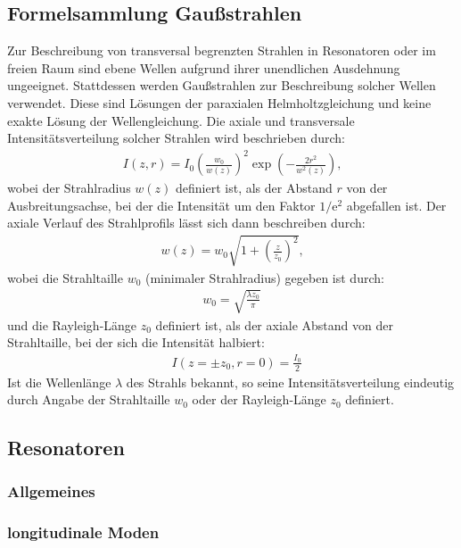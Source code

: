 \documentclass[11pt, a4paper]{article}
\numberwithin{equation}{section}
\begin{document}
\subsection{Formelsammlung Gaußstrahlen \cite{linden}}
\label{gaussstrahlen}
Zur Beschreibung von transversal begrenzten Strahlen in Resonatoren oder im freien Raum sind ebene Wellen aufgrund ihrer unendlichen Ausdehnung ungeeignet.
Stattdessen werden Gaußstrahlen zur Beschreibung solcher Wellen verwendet.
Diese sind Lösungen der paraxialen Helmholtzgleichung und keine exakte Lösung der Wellengleichung.
Die axiale und transversale Intensitätsverteilung solcher Strahlen wird beschrieben durch:
\begin{align}
	I(z,r) = I_0 \left( \frac{w_0}{w(z)} \right)^2 \exp\left(- \frac{2 r^2}{w^2(z)} \right) \text{,}
\end{align}
wobei der Strahlradius $w(z)$ definiert ist, als der Abstand $r$ von der Ausbreitungsachse, bei der die Intensität um den Faktor $1/ \mathrm{e}^2$ abgefallen ist.
Der axiale Verlauf des Strahlprofils lässt sich dann beschreiben durch:
\begin{align}
	w(z) = w_0 \sqrt{1 + \left( \frac{z}{z_0} \right)^2} \text{,}
	\label{eq:gauss_axialprofil}
\end{align}
wobei die Strahltaille $w_0$ (minimaler Strahlradius) gegeben ist durch:
\begin{align}
	w_0 = \sqrt{\frac{\lambda z_0}{\pi}}
	\label{eq:rayleigh_laenge}
\end{align}
und die Rayleigh-Länge $z_0$ definiert ist, als der axiale Abstand von der Strahltaille, bei der sich die Intensität halbiert:
\begin{align}
	&I(z = \pm z_0, r =0) = \frac{I_0}{2}
\end{align}
Ist die Wellenlänge $\lambda$ des Strahls bekannt, so seine Intensitätsverteilung eindeutig durch Angabe der Strahltaille $w_0$ oder der Rayleigh-Länge $z_0$ definiert.

\subsection{Resonatoren}
\subsubsection{Allgemeines}
\subsubsection{longitudinale Moden}
\end{document}
